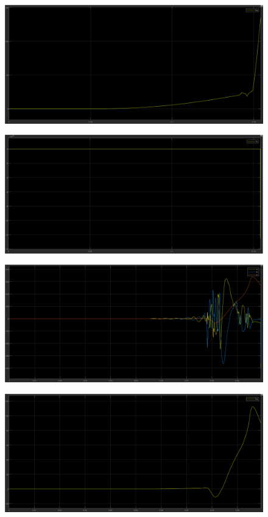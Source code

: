 \documentclass{article}
\begin{document}
\begin{figure}[H]
    \centering
    \includegraphics[width=1\textwidth]{5.2.5.d.9.png}
\end{figure}

\begin{figure}[H]
    \centering
    \includegraphics[width=1\textwidth]{5.2.5.d.10.png}
\end{figure}

\begin{figure}[H]
    \centering
    \includegraphics[width=1\textwidth]{5.2.5.d.11.png}
\end{figure}

\begin{figure}[H]
    \centering
    \includegraphics[width=1\textwidth]{5.2.5.d.12.png}
\end{figure}
\end{document}
